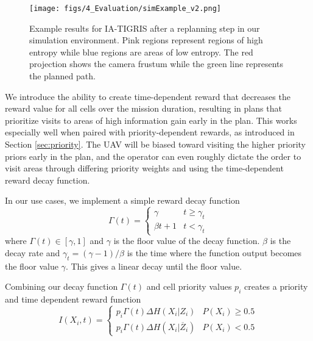 \begin{figure}[t]
\centering
\texttt{[image: figs/4\_Evaluation/simExample\_v2.png]}
\caption{Example results for IA-TIGRIS after a replanning step in our simulation environment. Pink regions represent regions of high entropy while blue regions are areas of low entropy. The red projection shows the camera frustum while the green line represents the planned path.}
\label{fig:simple_sim}
\end{figure}

We introduce the ability to create time-dependent reward that decreases the reward value for all cells over the mission duration, resulting in plans that prioritize visits to areas of high information gain early in the plan. This works especially well when paired with priority-dependent rewards, as introduced in Section \ref{sec:priority}. The UAV will be biased toward visiting the higher priority priors early in the plan, and the operator can even roughly dictate the order to visit areas through differing priority weights and using the time-dependent reward decay function.

In our use cases, we implement a simple reward decay function
\begin{equation*}
    \Gamma(t) = \begin{cases}  \gamma & t \geq \gamma_t \\ 
                               \beta t + 1 & t < \gamma_t 
                               \end{cases}
\end{equation*}
where $\Gamma(t) \in [\gamma, 1]$ and $\gamma$ is the floor value of the decay function. $\beta$ is the decay rate and $\gamma_t = (\gamma-1)/\beta$ is the time where the function output becomes the floor value $\gamma$. This gives a linear decay until the floor value. 

Combining our decay function $\Gamma(t)$ and cell priority values $p_i$ creates a priority and time dependent reward function 
\begin{equation*}
    I(X_i,t) = \begin{cases}  p_i\Gamma(t)\Delta H\left(X_i|Z_i\right) & P(X_i) \geq 0.5 \\ p_i\Gamma(t)\Delta H\left(X_i|\overline{Z}_i\right) & P(X_i) < 0.5 \end{cases}
\end{equation*}


